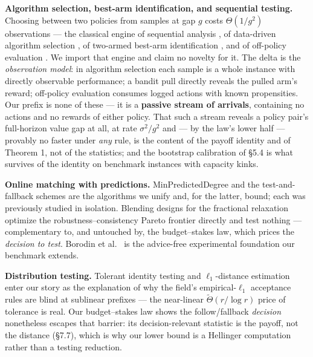\textbf{Algorithm selection, best-arm identification, and sequential
testing.} Choosing between two policies from samples at gap \(g\) costs
\(\Theta(1/g^2)\) observations --- the classical engine of sequential
analysis \cite{wald1947sequential}, of data-driven algorithm selection
\cite{gupta2017pac,balcan2020datadriven}, of two-armed best-arm
identification \cite{mannortsitsiklis2004,kaufmann2016complexity}, and
of off-policy evaluation \cite{dudik2011doubly}. We import that engine
and claim no novelty for it. The delta is the \emph{observation model}:
in algorithm selection each sample is a whole instance with directly
observable performance; a bandit pull directly reveals the pulled arm's
reward; off-policy evaluation consumes logged actions with known
propensities. Our prefix is none of these --- it is a \textbf{passive
stream of arrivals}, containing no actions and no rewards of either
policy. That such a stream reveals a policy pair's full-horizon value
gap at all, at rate \(\sigma^2/g^2\) and --- by the law's lower half ---
provably no faster under \emph{any} rule, is the content of the payoff
identity and of Theorem 1, not of the statistics; and the bootstrap
calibration of §5.4 is what survives of the identity on benchmark
instances with capacity kinks.

\textbf{Online matching with predictions.} MinPredictedDegree
\cite{aci2022mpd} and the test-and-fallback schemes
\cite{choo2024imperfect,bem2026testmatch} are the algorithms we unify
and, for the latter, bound; each was previously studied in isolation.
Blending designs for the fractional relaxation \cite{choo2025fractional}
optimize the robustness--consistency Pareto frontier directly and test
nothing --- complementary to, and untouched by, the budget--stakes law,
which prices the \emph{decision to test}. Borodin et
al.~\cite{borodin2018experimental} is the advice-free experimental
foundation our benchmark extends.

\textbf{Distribution testing.} Tolerant identity testing
\cite{canonne2022tolerance,valiant2011unseen} and \(\ell_1\)-distance
estimation \cite{jiao2018l1} enter our story as the explanation of why
the field's empirical-\(\ell_1\) acceptance rules are blind at sublinear
prefixes --- the near-linear \(\tilde\Theta(r/\log r)\) price of
tolerance is real. Our budget--stakes law shows the follow/fallback
\emph{decision} nonetheless escapes that barrier: its decision-relevant
statistic is the payoff, not the distance (§7.7), which is why our lower
bound is a Hellinger computation rather than a testing reduction.

